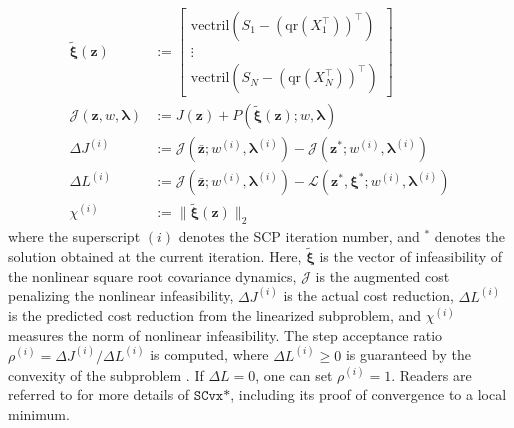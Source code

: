 {
\begin{align}
	\widetilde{\bm{\xi}}(\bm{z}) & := \begin{bmatrix}
		\mathrm{vectril}(S_1 - (\mathrm{qr}(X_1^{\top}))^\top) \\
		\vdots \\
		\mathrm{vectril}(S_N - (\mathrm{qr}(X_N^{\top}))^\top)
	\end{bmatrix} \\
	\mathcal{J}(\bm{z}, w, \bm{\lambda}) &:= J(\bm{z}) + P({\widetilde{\bm{\xi}}}(\bm{z}); w, \bm{\lambda}) \\
	\Delta J^{(i)} &:= \mathcal{J}(\bar{\bm{z}}; w^{(i)}, \bm{\lambda}^{(i)}) - \mathcal{J}(\bm{z}^*; w^{(i)}, \bm{\lambda}^{(i)}) \label{eq:delta_J} \\
	\Delta L^{(i)} &:= \mathcal{J}(\bar{\bm{z}}; w^{(i)}, \bm{\lambda}^{(i)}) - \mathcal{L}(\bm{z}^*, \bm{\xi}^*; w^{(i)}, \bm{\lambda}^{(i)}) \label{eq:delta_L}\\
	\chi^{(i)} &:= \|\widetilde{\bm{\xi}}(\bm{z})\|_2 \label{eq:chi}
\end{align}
}%
where the superscript $(i)$ denotes the SCP iteration number, and $^*$ denotes the solution obtained at the current iteration. Here, $\widetilde{\bm{\xi}}$ is the vector of infeasibility of the nonlinear square root covariance dynamics, $\mathcal{J}$ is the augmented cost penalizing the nonlinear infeasibility,  $\Delta J^{(i)}$ is the actual cost reduction, $\Delta L^{(i)}$ is the predicted cost reduction from the linearized subproblem, and $\chi^{(i)}$ measures the norm of nonlinear infeasibility. The step acceptance ratio $\rho^{(i)} = \Delta J^{(i)} / \Delta L^{(i)}$ is computed, where $\Delta L^{(i)} \geq 0$ is guaranteed by the convexity of the subproblem \cite{oguriSuccessiveConvexificationFeasibility2023a}. If $\Delta L = 0$, one can set $\rho^{(i)} = 1$. 
Readers are referred to \cite{oguriSuccessiveConvexificationFeasibility2023a} for more details of $\texttt{SCvx*}$, including its proof of convergence to a local minimum.

